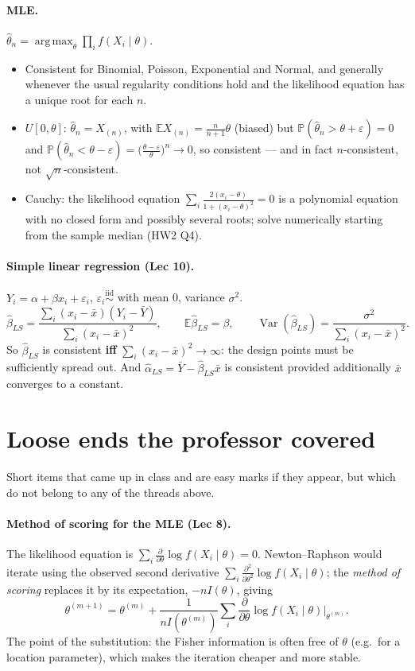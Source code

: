 \documentclass[11pt]{article}
\theoremstyle{remark}
\newcommand{\E}{\mathbb{E}}
\newcommand{\Var}{\operatorname{Var}}
\newcommand{\Prob}{\mathbb{P}}
\newcommand{\iid}{\overset{\text{iid}}{\sim}}
\DeclareMathOperator*{\argmax}{arg\,max}
\begin{document}
\paragraph{MLE.} $\hat\theta_n=\argmax_\theta\prod_i f(X_i\mid\theta)$.
\begin{itemize}
\item Consistent for Binomial, Poisson, Exponential and Normal, and generally whenever the
usual regularity conditions hold and the likelihood equation has a unique root for each $n$.
\item $U[0,\theta]$: $\hat\theta_n=X_{(n)}$, with $\E X_{(n)}=\frac{n}{n+1}\theta$ (biased) but
$\Prob(\hat\theta_n>\theta+\varepsilon)=0$ and
$\Prob(\hat\theta_n<\theta-\varepsilon)=\big(\tfrac{\theta-\varepsilon}{\theta}\big)^n\to0$, so
consistent --- and in fact $n$-consistent, not $\sqrt n$-consistent.
\item Cauchy: the likelihood equation $\sum_i\frac{2(x_i-\theta)}{1+(x_i-\theta)^2}=0$ is a
polynomial equation with no closed form and possibly several roots; solve numerically
starting from the sample median (HW2 Q4).
\end{itemize}

\paragraph{Simple linear regression (Lec 10).}
$Y_i=\alpha+\beta x_i+\varepsilon_i$, $\varepsilon_i\iid$ with mean 0, variance $\sigma^2$.
\[
\hat\beta_{LS}=\frac{\sum_i(x_i-\bar x)(Y_i-\bar Y)}{\sum_i(x_i-\bar x)^2},\qquad
\E\hat\beta_{LS}=\beta,\qquad
\Var(\hat\beta_{LS})=\frac{\sigma^2}{\sum_i(x_i-\bar x)^2}.
\]
So $\hat\beta_{LS}$ is consistent \textbf{iff} $\sum_i(x_i-\bar x)^2\to\infty$: the design
points must be sufficiently spread out. And $\hat\alpha_{LS}=\bar Y-\hat\beta_{LS}\bar x$ is
consistent provided additionally $\bar x$ converges to a constant.

\section{Loose ends the professor covered}

Short items that came up in class and are easy marks if they appear, but which do not belong
to any of the threads above.

\paragraph{Method of scoring for the MLE (Lec 8).}
The likelihood equation is $\sum_i\frac{\partial}{\partial\theta}\log f(X_i\mid\theta)=0$.
Newton--Raphson would iterate using the observed second derivative
$\sum_i\frac{\partial^2}{\partial\theta^2}\log f(X_i\mid\theta)$; the \emph{method of scoring}
replaces it by its expectation, $-nI(\theta)$, giving
\[
\theta^{(m+1)}=\theta^{(m)}+\frac{1}{n I(\theta^{(m)})}\sum_i\frac{\partial}{\partial\theta}\log f(X_i\mid\theta)\Big|_{\theta^{(m)}} .
\]
The point of the substitution: the Fisher information is often free of $\theta$ (e.g.\ for a
location parameter), which makes the iteration cheaper and more stable.
\end{document}
